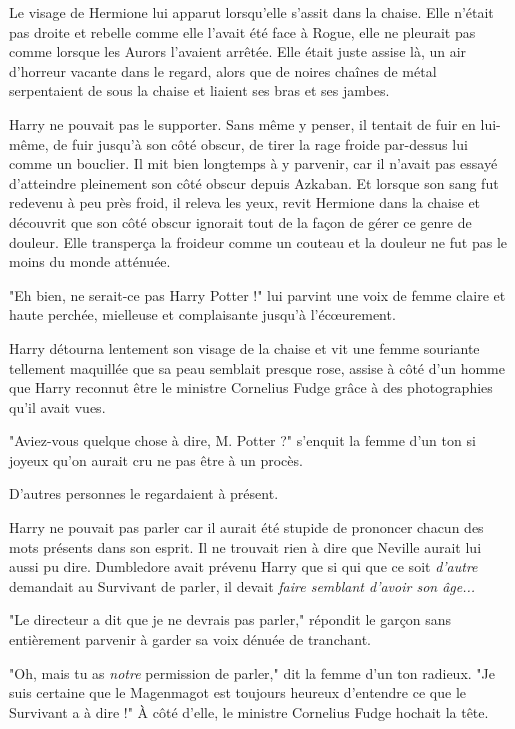 Le visage de Hermione lui apparut lorsqu'elle s'assit dans la chaise. Elle n'était pas droite et rebelle comme elle l'avait été face à Rogue, elle ne pleurait pas comme lorsque les Aurors l'avaient arrêtée. Elle était juste assise là, un air d'horreur vacante dans le regard, alors que de noires chaînes de métal serpentaient de sous la chaise et liaient ses bras et ses jambes.

Harry ne pouvait pas le supporter. Sans même y penser, il tentait de fuir en lui-même, de fuir jusqu'à son côté obscur, de tirer la rage froide par-dessus lui comme un bouclier. Il mit bien longtemps à y parvenir, car il n'avait pas essayé d'atteindre pleinement son côté obscur depuis Azkaban. Et lorsque son sang fut redevenu à peu près froid, il releva les yeux, revit Hermione dans la chaise et découvrit que son côté obscur ignorait tout de la façon de gérer ce genre de douleur. Elle transperça la froideur comme un couteau et la douleur ne fut pas le moins du monde atténuée.

"Eh bien, ne serait-ce pas Harry Potter !" lui parvint une voix de femme claire et haute perchée, mielleuse et complaisante jusqu'à l'écœurement.

Harry détourna lentement son visage de la chaise et vit une femme souriante tellement maquillée que sa peau semblait presque rose, assise à côté d'un homme que Harry reconnut être le ministre Cornelius Fudge grâce à des photographies qu'il avait vues.

"Aviez-vous quelque chose à dire, M. Potter ?" s'enquit la femme d'un ton si joyeux qu'on aurait cru ne pas être à un procès.

D'autres personnes le regardaient à présent.

Harry ne pouvait pas parler car il aurait été stupide de prononcer chacun des mots présents dans son esprit. Il ne trouvait rien à dire que Neville aurait lui aussi pu dire. Dumbledore avait prévenu Harry que si qui que ce soit \emph{d'autre}  demandait au Survivant de parler, il devait \emph{faire semblant d'avoir son âge...} 

"Le directeur a dit que je ne devrais pas parler," répondit le garçon sans entièrement parvenir à garder sa voix dénuée de tranchant.

"Oh, mais tu as \emph{notre}  permission de parler," dit la femme d'un ton radieux. "Je suis certaine que le Magenmagot est toujours heureux d'entendre ce que le Survivant a à dire !" À côté d'elle, le ministre Cornelius Fudge hochait la tête.

